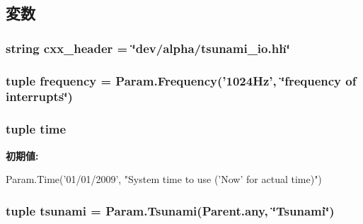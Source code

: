 \subsection{変数}
\hypertarget{classTsunami_1_1TsunamiIO_a17da7064bc5c518791f0c891eff05fda}{
\subsubsection[{cxx\_\-header}]{\setlength{\rightskip}{0pt plus 5cm}string {\bf cxx\_\-header} = \char`\"{}dev/alpha/tsunami\_\-io.hh\char`\"{}}}
\label{classTsunami_1_1TsunamiIO_a17da7064bc5c518791f0c891eff05fda}
\hypertarget{classTsunami_1_1TsunamiIO_aa6caae816bc3cac7f328268ca3cdf2f7}{
\subsubsection[{frequency}]{\setlength{\rightskip}{0pt plus 5cm}tuple {\bf frequency} = Param.Frequency('1024Hz', \char`\"{}frequency of interrupts\char`\"{})}}
\label{classTsunami_1_1TsunamiIO_aa6caae816bc3cac7f328268ca3cdf2f7}
\hypertarget{classTsunami_1_1TsunamiIO_a429c35172fbcb8b1788bead147e4719b}{
\subsubsection[{time}]{\setlength{\rightskip}{0pt plus 5cm}tuple {\bf time}}}
\label{classTsunami_1_1TsunamiIO_a429c35172fbcb8b1788bead147e4719b}
{\bfseries 初期値:}
\begin{DoxyCode}
Param.Time('01/01/2009',
        "System time to use ('Now' for actual time)")
\end{DoxyCode}
\hypertarget{classTsunami_1_1TsunamiIO_aabfaa1eda1546a625690c7a59b7fed04}{
\subsubsection[{tsunami}]{\setlength{\rightskip}{0pt plus 5cm}tuple {\bf tsunami} = Param.Tsunami(Parent.any, \char`\"{}Tsunami\char`\"{})}}
